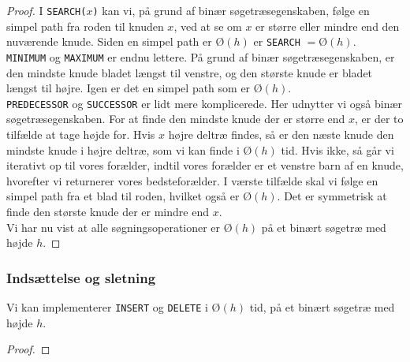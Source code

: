 \begin{proof}
  I \texttt{SEARCH($x$)} kan vi, på grund af binær søgetræsegenskaben, følge en simpel path fra roden til knuden $x$, ved at se om $x$ er større eller mindre end den nuværende knude. Siden en simpel path er $Ø(h)$ er \texttt{SEARCH} $= Ø(h)$.\\

  \texttt{MINIMUM} og \texttt{MAXIMUM} er endnu lettere. På grund af binær søgetræsegenskaben, er den mindste knude bladet længst til venstre, og den største knude er bladet længst til højre. Igen er det en simpel path som er $Ø(h)$.\\

  \texttt{PREDECESSOR} og \texttt{SUCCESSOR} er lidt mere komplicerede. Her udnytter vi også binær søgetræsegenskaben. For at finde den mindste knude der er større end $x$, er der to tilfælde at tage højde for. Hvis $x$ højre deltræ findes, så er den næste knude den mindste knude i højre deltræ, som vi kan finde i $Ø(h)$ tid. Hvis ikke, så går vi iterativt op til vores forælder, indtil vores forælder er et venstre barn af en knude, hvorefter vi returnerer vores bedsteforælder. I værste tilfælde skal vi følge en simpel path fra et blad til roden, hvilket også er $Ø(h)$. Det er symmetrisk at finde den største knude der er mindre end $x$.\\

  Vi har nu vist at alle søgningsoperationer er $Ø(h)$ på et binært søgetræ med højde $h$.
\end{proof}

\subsubsection*{Indsættelse og sletning}

\begin{theorem}
  Vi kan implementerer \texttt{INSERT} og \texttt{DELETE} i $Ø(h)$ tid, på et binært søgetræ med højde $h$.
\end{theorem}

\begin{proof}
  
\end{proof}


